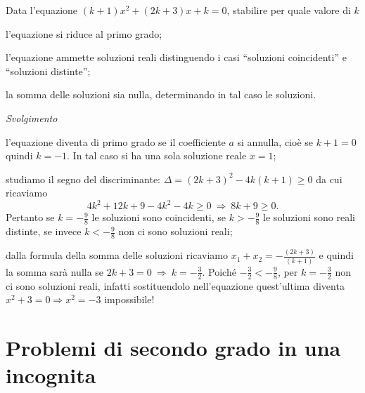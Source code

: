 \begin{exrig}
\begin{esempio}
Data l'equazione $( k + 1 ) x^{2} + ( 2 k + 3 ) x + k = 0$, stabilire per quale valore di $k$
\begin{enumeratea}
\item l'equazione si riduce al primo grado;
\item l'equazione ammette soluzioni reali distinguendo i casi ``soluzioni coincidenti'' e ``soluzioni distinte'';
\item la somma delle soluzioni sia nulla, determinando in tal caso le soluzioni.
\end{enumeratea}
\emph{Svolgimento}
\begin{enumeratea}
\item l'equazione diventa di primo grado se il coefficiente $a$ si annulla, cioè se $k + 1 = 0$ quindi $k = - 1$. In tal caso si ha una sola soluzione reale $ x=1 $;
\item studiamo il segno del discriminante: $\Delta = ( 2 k + 3 )^{2} - 4 k ( k + 1 ) \geq 0$ da cui ricaviamo 
\[4 k^{2} + 12 k + 9 - 4 k^{2} - 4 k \geq 0 \:\Rightarrow\: 8 k + 9 \geq 0.\] 
Pertanto se $k = - \frac{9}{8}$ le soluzioni sono coincidenti, se $k > - \frac{9}{8}$ le soluzioni sono reali distinte, se invece $ k<-\frac{9}{8} $ non ci sono soluzioni reali;
\item dalla formula della somma delle soluzioni ricaviamo $x_{1} + x_{2} = - \frac{( 2 k + 3 )}{( k + 1 )}$ e quindi la somma sarà nulla se $2 k + 3 = 0 \:\Rightarrow\: k = - \frac{3}{2}$. Poiché $- \frac{3}{2} < - \frac{9}{8}$, per $k = - \frac{3}{2}$ non ci sono soluzioni reali, infatti sostituendolo nell'equazione quest'ultima diventa $ x^2+3=0 \Rightarrow x^2=-3$ impossibile!
\end{enumeratea}
\end{esempio}
\end{exrig}
\vspazio\ovalbox{\risolvii \ref{ese:3.98}, \ref{ese:3.99}, \ref{ese:3.100}, \ref{ese:3.101}, \ref{ese:3.102}, \ref{ese:3.103}, \ref{ese:3.104}, \ref{ese:3.105}, \ref{ese:3.106}, \ref{ese:3.107}, \ref{ese:3.108},}

\vspazio\ovalbox{ \ref{ese:3.109},\ref{ese:3.110}, \ref{ese:3.111}, \ref{ese:3.112}, \ref{ese:3.113}, \ref{ese:3.114}, \ref{ese:3.115}, \ref{ese:3.116}, \ref{ese:3.117}, \ref{ese:3.118}, \ref{ese:3.119}, \ref{ese:3.120}, \ref{ese:3.121}, \ref{ese:3.122}}

\section{Problemi di secondo grado in una incognita}

